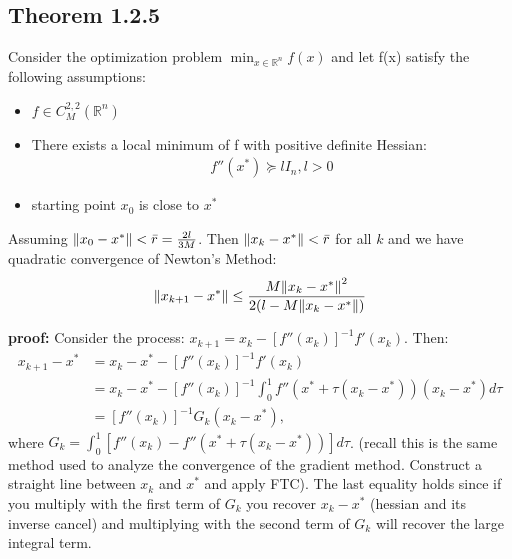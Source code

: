 \documentclass[12pt,a4paper]{article}
\begin{document}
	\subsection*{Theorem 1.2.5}\label{thm125}
	Consider the optimization problem $\min_{x \in \mathbb{R}^n}f(x)$  and
	let f(x) satisfy the following assumptions:
	\begin{itemize}
		\item $f \in C_M^{2,2}(\mathbb{R}^n)$
		\item There exists a local minimum of f with positive definite Hessian:
		\begin{align*}
			f''(x^*) \succeq lI_n, l > 0
		\end{align*}
		\item starting point $x_0$ is close to $x^*$
	\end{itemize}
	Assuming $\norm{x_0 - x^*} < \bar{r} = \frac{2l}{3M}$. Then $\norm{x_k - x^*} < \bar{r}$ for all $k$ and we have quadratic convergence of Newton's Method:
	\begin{align*}
		\norm{x_{k+1} - x^*} \leq \frac{M \norm{x_k - x^*}^2}{2(l-M\norm{x_k -x^*})}
	\end{align*}
	
	\textbf{proof:} Consider the process: $x_{k+1} = x_k - [f''(x_k)]^{-1}f'(x_k)$. Then:
	\begin{align*}
		x_{k+1} - x^* &= x_k - x^* - [f''(x_k)]^{-1}f'(x_k) \\
		&= x_k - x^* - [f''(x_k)]^{-1}\int_{0}^{1}f''(x^* + \tau(x_k - x^*))(x_k - x^*)d\tau \\
		&= [f''(x_k)]^{-1}G_k(x_k - x^*),
	\end{align*}
	where $G_k = \int_{0}^{1}[f''(x_k) - f''(x^* + \tau (x_k - x^*))]d\tau$.
	 (recall this is the same method used to analyze the convergence of the gradient method. Construct a straight line between $x_k$ and $x^*$ and apply FTC). The last equality holds since if you multiply with the first term of $G_k$ you recover $x_k - x^*$ (hessian and its inverse cancel) and multiplying with the second term of $G_k$ will recover the large integral term.
	 
\end{document}
